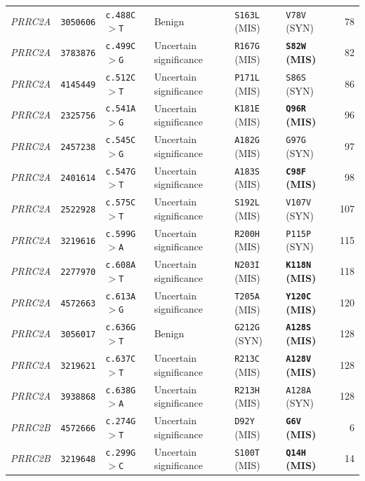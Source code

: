 \documentclass[10pt,letterpaper]{article}
\newcommand{\gene}[1]{\textit{#1}}
\begin{document}
{\begin{longtable}{@{}llllllr@{}}
\gene{PRRC2A} & \texttt{3050606} & \texttt{c.488C$>$T} & Benign & \texttt{S163L} (MIS) & \texttt{V78V} (SYN) & 78 \\
\gene{PRRC2A} & \texttt{3783876} & \texttt{c.499C$>$G} & Uncertain significance & \texttt{R167G} (MIS) & \textbf{\texttt{S82W} (MIS)} & 82 \\
\gene{PRRC2A} & \texttt{4145449} & \texttt{c.512C$>$T} & Uncertain significance & \texttt{P171L} (MIS) & \texttt{S86S} (SYN) & 86 \\
\gene{PRRC2A} & \texttt{2325756} & \texttt{c.541A$>$G} & Uncertain significance & \texttt{K181E} (MIS) & \textbf{\texttt{Q96R} (MIS)} & 96 \\
\gene{PRRC2A} & \texttt{2457238} & \texttt{c.545C$>$G} & Uncertain significance & \texttt{A182G} (MIS) & \texttt{G97G} (SYN) & 97 \\
\gene{PRRC2A} & \texttt{2401614} & \texttt{c.547G$>$T} & Uncertain significance & \texttt{A183S} (MIS) & \textbf{\texttt{C98F} (MIS)} & 98 \\
\gene{PRRC2A} & \texttt{2522928} & \texttt{c.575C$>$T} & Uncertain significance & \texttt{S192L} (MIS) & \texttt{V107V} (SYN) & 107 \\
\gene{PRRC2A} & \texttt{3219616} & \texttt{c.599G$>$A} & Uncertain significance & \texttt{R200H} (MIS) & \texttt{P115P} (SYN) & 115 \\
\gene{PRRC2A} & \texttt{2277970} & \texttt{c.608A$>$T} & Uncertain significance & \texttt{N203I} (MIS) & \textbf{\texttt{K118N} (MIS)} & 118 \\
\gene{PRRC2A} & \texttt{4572663} & \texttt{c.613A$>$G} & Uncertain significance & \texttt{T205A} (MIS) & \textbf{\texttt{Y120C} (MIS)} & 120 \\
\gene{PRRC2A} & \texttt{3056017} & \texttt{c.636G$>$T} & Benign & \texttt{G212G} (SYN) & \textbf{\texttt{A128S} (MIS)} & 128 \\
\gene{PRRC2A} & \texttt{3219621} & \texttt{c.637C$>$T} & Uncertain significance & \texttt{R213C} (MIS) & \textbf{\texttt{A128V} (MIS)} & 128 \\
\gene{PRRC2A} & \texttt{3938868} & \texttt{c.638G$>$A} & Uncertain significance & \texttt{R213H} (MIS) & \texttt{A128A} (SYN) & 128 \\
\gene{PRRC2B} & \texttt{4572666} & \texttt{c.274G$>$T} & Uncertain significance & \texttt{D92Y} (MIS) & \textbf{\texttt{G6V} (MIS)} & 6 \\
\gene{PRRC2B} & \texttt{3219648} & \texttt{c.299G$>$C} & Uncertain significance & \texttt{S100T} (MIS) & \textbf{\texttt{Q14H} (MIS)} & 14 \\

\end{longtable}}
\end{document}
